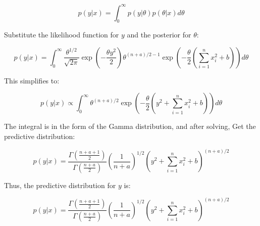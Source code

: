 \documentclass{article}
\begin{document}
\[
p(y | x) = \int_0^\infty p(y | \theta) p(\theta | x) d\theta
\]

Substitute the likelihood function for \( y \) and the posterior for \( \theta \):

\[
p(y | x) = \int_0^\infty \frac{\theta^{1/2}}{\sqrt{2\pi}} \exp \left( -\frac{\theta y^2}{2} \right) \theta^{(n + a)/2 - 1} \exp \left( -\frac{\theta}{2} \left( \sum_{i=1}^{n} x_i^2 + b \right) \right) d\theta
\]

This simplifies to:

\[
p(y | x) \propto \int_0^\infty \theta^{(n + a)/2} \exp \left( -\frac{\theta}{2} \left( y^2 + \sum_{i=1}^{n} x_i^2 + b \right) \right) d\theta
\]

The integral is in the form of the Gamma distribution, and after solving, Get the predictive distribution:

\[
p(y | x) = \frac{\Gamma\left( \frac{n + a + 1}{2} \right)}{\Gamma\left( \frac{n + a}{2} \right)} \left( \frac{1}{n + a} \right)^{1/2} \left( y^2 + \sum_{i=1}^{n} x_i^2 + b \right)^{(n + a)/2}
\]

Thus, the predictive distribution for \( y \) is:

\[
p(y | x) = \frac{\Gamma\left( \frac{n + a + 1}{2} \right)}{\Gamma\left( \frac{n + a}{2} \right)} \left( \frac{1}{n + a} \right)^{1/2} \left( y^2 + \sum_{i=1}^{n} x_i^2 + b \right)^{(n + a)/2}
\]
\end{document}
